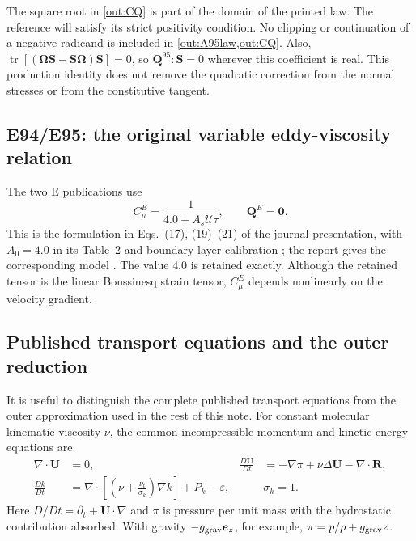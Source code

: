 \documentclass[11pt,a4paper]{article}
\numberwithin{equation}{section}
\newcommand{\eps}{\varepsilon}
\newcommand{\nut}{\nu_t}
\newcommand{\R}{\boldsymbol R}
\newcommand{\Q}{\boldsymbol Q}
\newcommand{\Smat}{\boldsymbol S}
\newcommand{\Omat}{\boldsymbol\Omega}
\DeclareMathOperator{\tr}{tr}
\begin{document}
The square root in \cref{out:CQ} is part of the domain of the printed
law. The reference will satisfy its strict positivity condition.
No clipping or continuation of a negative radicand is included in
\cref{out:A95law,out:CQ}. Also,
$\tr[(\Omat\Smat-\Smat\Omat)\Smat]=0$, so
$\Q^{95}:\Smat=0$ wherever this coefficient is real. This production
identity does not remove the quadratic correction from the normal
stresses or from the constitutive tangent.

\subsection{E94/E95: the original variable eddy-viscosity relation}
\label{out:E}

The two E publications use
\begin{equation}
 \boxed{C_\mu^E=\frac1{4.0+A_s\mathcal U\tau},\qquad
        \Q^E=\boldsymbol0.}
 \label{out:Elaw}
\end{equation}
This is the formulation in Eqs.~(17), (19)--(21) of the journal
presentation, with $A_0=4.0$ in its Table~2 and boundary-layer
calibration \citep{Shih1995EVM}; the report gives the corresponding
model \citep{Shih1994EVM}. The value $4.0$ is retained exactly.
Although the retained tensor is the linear Boussinesq strain tensor,
$C_\mu^E$ depends nonlinearly on the velocity gradient.

\subsection{Published transport equations and the outer reduction}
\label{out:transport}

It is useful to distinguish the complete published transport equations
from the outer approximation used in the rest of this note. For constant
molecular kinematic viscosity $\nu$, the common incompressible momentum
and kinetic-energy equations are
\begin{align}
 \nabla\cdot\boldsymbol U&=0,
 &\frac{D\boldsymbol U}{Dt}
   &=-\nabla\pi+\nu\Delta\boldsymbol U-\nabla\cdot\R,
   \label{out:originalmomentum}\\
 \frac{Dk}{Dt}
   &=\nabla\cdot\left[\left(\nu+\frac{\nut}{\sigma_k}\right)
                  \nabla k\right]+P_k-\eps,
 &&\sigma_k=1.
 \label{out:originalk}
\end{align}
Here $D/Dt=\partial_t+\boldsymbol U\cdot\nabla$ and $\pi$ is pressure
per unit mass with the hydrostatic contribution absorbed. With gravity
$-g_{\rm grav}\boldsymbol e_z$, for example,
$\pi=p/\rho+g_{\rm grav}z$.
\end{document}
